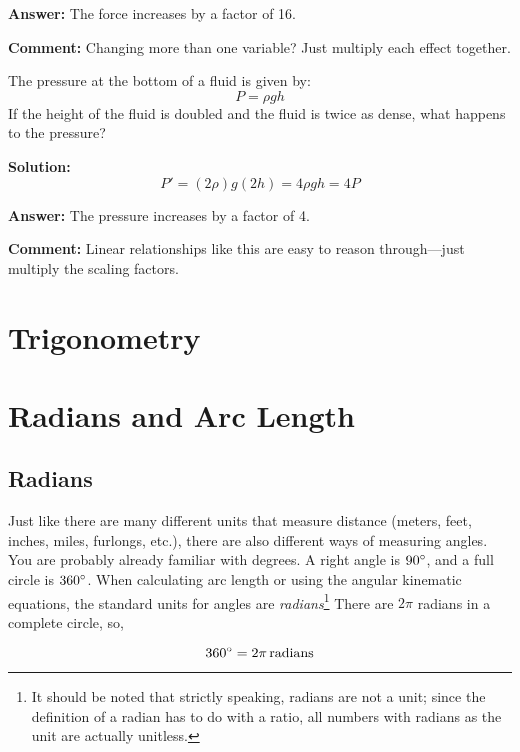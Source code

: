 \textbf{Answer:} The force increases by a factor of 16.

\textbf{Comment:} Changing more than one variable? Just multiply each effect together.

\vspace{1em}

	The pressure at the bottom of a fluid is given by:
	\[
	P = \rho g h
	\]
	If the height of the fluid is doubled and the fluid is twice as dense, what happens to the pressure?


\textbf{Solution:}
\[
P' = (2\rho) g (2h) = 4 \rho g h = 4P
\]

\textbf{Answer:} The pressure increases by a factor of 4.

\textbf{Comment:} Linear relationships like this are easy to reason through—just multiply the scaling factors.


\newpage
\section{Trigonometry}

\newpage
\section {Radians and Arc Length}
\subsection{Radians} 

Just like there are many different units that measure distance (meters, feet, inches, miles, furlongs, etc.), there are also different ways of measuring angles.  You are probably already familiar with degrees. A right angle is $90 \degree$, and a full circle is $360 \degree$.  When calculating arc length or using the angular kinematic equations, the standard units for angles are \textit{radians}\footnote{It should be noted that strictly speaking, radians are not a unit; since the definition of a radian has to do with a ratio, all numbers with radians as the unit are actually unitless.}  There are $2 \pi$ radians in a complete circle, so,

	\begin{mdframed}[backgroundcolor=green!20!white]
	\begin{equation*}
		360 \degree = 2 \pi \, \si{radians}
		\label{conversion:radiandegree}
	\end{equation*}
\end{mdframed}	

